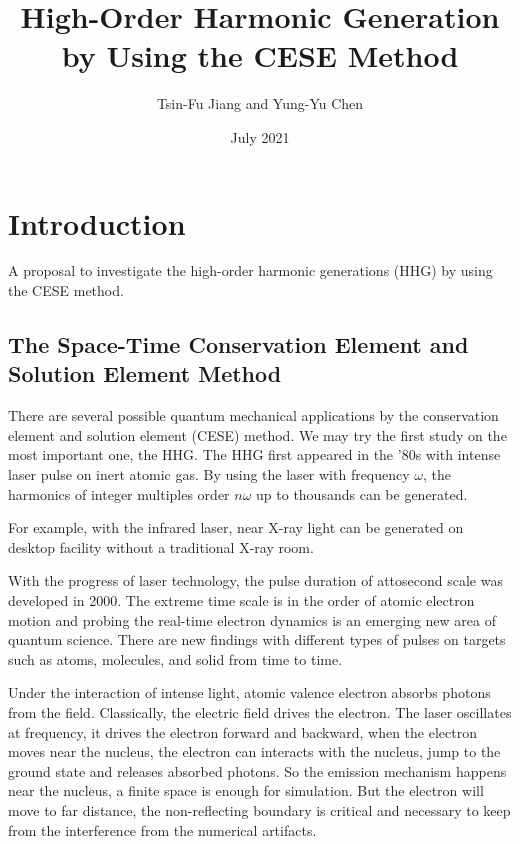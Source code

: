 \documentclass{isildur}
\title{
%
High-Order Harmonic Generation by Using the CESE Method
%
}
\author{
%
Tsin-Fu Jiang and Yung-Yu Chen
%
}
\date{July 2021}
\begin{document}
\maketitle

\tableofcontents

\chapter{Introduction}
\label{c:intro}

A proposal to investigate the high-order harmonic generations (HHG) by using
the CESE method.

\section{The Space-Time Conservation Element and Solution Element Method}

There are several possible quantum mechanical applications by the conservation
element and solution element (CESE) method.  We may try the first study on the
most important one, the HHG.  The HHG first appeared in the ’80s with intense
laser pulse on inert atomic gas.  By using the laser with frequency $\omega$,
the harmonics of integer multiples order $n\omega$ up to thousands can be
generated.

For example, with the infrared laser, near X-ray light can be generated on
desktop facility without a traditional X-ray room.

With the progress of laser technology, the pulse duration of attosecond scale
was developed in 2000.  The extreme time scale is in the order of atomic
electron motion and probing the real-time electron dynamics is an emerging new
area of quantum science.  There are new findings with different types of pulses
on targets such as atoms, molecules, and solid from time to time.

Under the interaction of intense light, atomic valence electron absorbs photons
from the field.  Classically, the electric field drives the electron.  The
laser oscillates at frequency, it drives the electron forward and backward,
when the electron moves near the nucleus, the electron can interacts with the
nucleus, jump to the ground state and releases absorbed photons.  So the
emission mechanism happens near the nucleus, a finite space is enough for
simulation.  But the electron will move to far distance, the non-reflecting
boundary is critical and necessary to keep from the interference from the
numerical artifacts.
\end{document}
